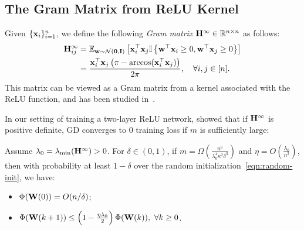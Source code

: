 	

\subsection{The Gram Matrix from ReLU Kernel}\label{sec:relu_kernel}
Given $\{\mathbf{x}_i\}_{i=1}^n$, we define the following \emph{Gram matrix} $\mathbf{H}^\infty \in \mathbb{R}^{n\times n}$ as follows:
\begin{equation}\label{eqn:H_infy_defn}
\begin{aligned}
\mathbf{H}_{ij}^\infty &= \mathbb{E}_{\mathbf{w} \sim \mathcal{N}(\mathbf{0},\mathbf{I})}\left[ \mathbf{x}_i^\top \mathbf{x}_j\mathbb{I}\left\{\mathbf{w}^\top \mathbf{x}_i \ge 0, \mathbf{w}^\top \mathbf{x}_j \ge 0\right\}\right] \\
&= \frac{\mathbf{x}_i^\top\mathbf{x}_j\left(\pi - \arccos(\mathbf{x}_i^\top\mathbf{x}_j)\right)}{2\pi}, \quad \forall i, j\in[n].
\end{aligned}
\end{equation}
This matrix can be viewed as a Gram matrix from a kernel associated with the ReLU function, and has been studied in~\citep{xie2017diverse,tsuchida2017invariance,du2018provably}.

In our setting of training a two-layer ReLU network, \citet{du2018provably} showed that if $\mathbf{H}^\infty$ is positive definite, GD converges to $0$ training loss if $m$ is sufficiently large:
\begin{thm}[\citep{du2018provably}\footnote{\citet{du2018provably} only considered the case $\kappa=1$, but it is straightforward to generalize their result to general $\kappa$ at the price of an extra $1/\kappa^2$ factor in $m$.}]
	\label{thm:ssdu-converge}
	Assume $\lambda_0 = \lambda_{\min}(\mathbf{H}^\infty) >0$. For $\delta\in(0, 1)$, if $m = \Omega\left( \frac{n^6}{\lambda_0^4 \kappa^2 \delta^3 } \right)$ and $\eta = O\left( \frac{\lambda_0}{n^2} \right)$, then with probability at least $1-\delta$ over the random initialization~\eqref{eqn:random-init}, we have:
	\begin{itemize}
		\item $\Phi(\mathbf{W}(0)) = O(n/\delta)$;
		\item $\Phi(\mathbf{W}(k+1)) \le \left( 1 - \frac{\eta \lambda_0}{2}\right)	\Phi(\mathbf{W}(k)),\  \forall k\ge0$.
	\end{itemize}
\end{thm}

